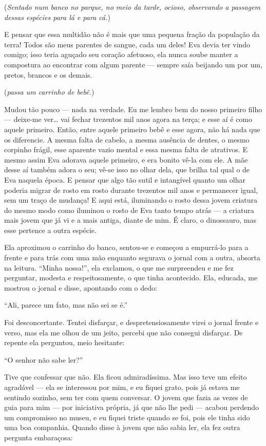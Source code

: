 \noindent (\textit{Sentado num banco no parque, no meio da tarde, ocioso, observando a passagem
dessas espécies para lá e para cá.})

E pensar que essa multidão não é mais que uma
pequena fração da população da terra! Todos são meus parentes de sangue, cada um
deles! Eva devia ter vindo comigo; isso teria aguçado seu coração afetuoso,
ela nunca soube manter a compostura ao encontrar com algum parente --- sempre saía
beijando um por um, pretos, brancos e os demais.

(\textit{passa um carrinho de bebê.})

Mudou tão pouco --- nada na verdade. Eu me lembro bem do nosso primeiro filho --- deixe-me
ver\ldots{} vai fechar trezentos mil anos agora na terça; e esse aí é como aquele
primeiro. Então, entre aquele primeiro bebê e esse agora, não há nada que os
diferencie. A mesma falta de cabelo, a mesma ausência de dentes, o mesmo corpinho
frágil, esse aparente vazio mental e essa mesma falta de atrativos. E mesmo assim
Eva adorava aquele primeiro, e era bonito vê-la com ele. A mãe desse aí
também adora o seu; vê-se isso no olhar dela, que brilha tal qual o de Eva naquela
época. E pensar que algo tão sutil e intangível quanto um olhar poderia migrar de
rosto em rosto durante trezentos mil anos e permanecer igual, sem um traço de
mudança! E aqui está, iluminando o rosto dessa jovem criatura do mesmo modo como
iluminou o rosto de Eva tanto tempo atrás --- a criatura mais jovem que já vi e a
mais antiga, diante de mim. É claro, o dinossauro, mas esse pertence a outra
espécie.

Ela aproximou o carrinho do banco, sentou-se e começou a empurrá-lo para a frente
e para trás com uma mão enquanto segurava o jornal com a outra, absorta na
leitura. “Minha nossa!”, ela exclamou, o que me surpreendeu e me fez
perguntar, modesta e respeitosamente, o que tinha acontecido. Ela,
educada, me mostrou o jornal e disse, apontando com o dedo:

“Ali, parece um fato, mas não sei se é.”

Foi desconcertante. Tentei disfarçar, e despretensiosamente virei o jornal frente e
verso, mas ela me olhou de um jeito, percebi que não consegui disfarçar. De
repente ela perguntou, meio hesitante:

“O senhor não sabe ler?”

Tive que confessar que não. Ela ficou admiradíssima. Mas isso teve um efeito
agradável --- ela se interessou por mim, e eu fiquei grato, pois já estava me
sentindo sozinho, sem ter com quem conversar. O jovem que fazia as vezes
de guia para mim --- por iniciativa própria, já que não lhe pedi --- acabou
perdendo um compromisso no museu, e eu fiquei triste quando se foi, pois ele tinha    
sido uma boa companhia. Quando disse à jovem que não sabia ler, ela fez outra
pergunta embaraçosa:

